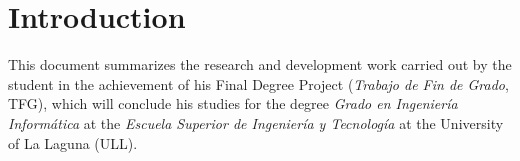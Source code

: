 
\cleardoublepage
\chapter{Introduction} \label{chap:Introduction}

This document summarizes the research and development work carried out by the student in the achievement of his Final Degree Project (\textit{Trabajo de Fin de Grado}, TFG), which will conclude his studies for the degree \textit{Grado en Ingeniería Informática} at the \textit{Escuela Superior de Ingeniería y Tecnología} at the University of La Laguna (ULL).


